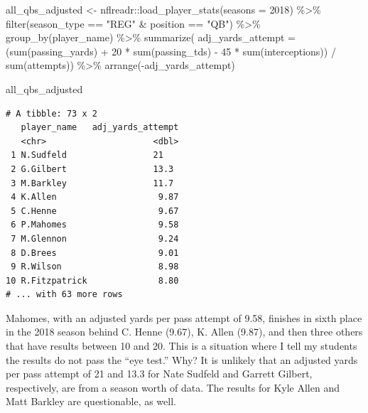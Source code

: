 \documentclass[
  letterpaper,
]{krantz}
\newenvironment{Shaded}{\begin{snugshade}}{\end{snugshade}}
\newcommand{\AttributeTok}[1]{\textcolor[rgb]{0.40,0.45,0.13}{#1}}
\newcommand{\DecValTok}[1]{\textcolor[rgb]{0.68,0.00,0.00}{#1}}
\newcommand{\FunctionTok}[1]{\textcolor[rgb]{0.28,0.35,0.67}{#1}}
\newcommand{\NormalTok}[1]{\textcolor[rgb]{0.00,0.23,0.31}{#1}}
\newcommand{\OtherTok}[1]{\textcolor[rgb]{0.00,0.23,0.31}{#1}}
\newcommand{\SpecialCharTok}[1]{\textcolor[rgb]{0.37,0.37,0.37}{#1}}
\newcommand{\StringTok}[1]{\textcolor[rgb]{0.13,0.47,0.30}{#1}}
\begin{document}
\begin{Shaded}
\begin{Highlighting}[]
\NormalTok{all\_qbs\_adjusted }\OtherTok{\textless{}{-}}\NormalTok{ nflreadr}\SpecialCharTok{::}\FunctionTok{load\_player\_stats}\NormalTok{(}\AttributeTok{seasons =} \DecValTok{2018}\NormalTok{) }\SpecialCharTok{\%\textgreater{}\%}
  \FunctionTok{filter}\NormalTok{(season\_type }\SpecialCharTok{==} \StringTok{"REG"} \SpecialCharTok{\&}\NormalTok{ position }\SpecialCharTok{==} \StringTok{"QB"}\NormalTok{) }\SpecialCharTok{\%\textgreater{}\%}
  \FunctionTok{group\_by}\NormalTok{(player\_name) }\SpecialCharTok{\%\textgreater{}\%}
  \FunctionTok{summarize}\NormalTok{(}
    \AttributeTok{adj\_yards\_attempt =}\NormalTok{ (}\FunctionTok{sum}\NormalTok{(passing\_yards) }\SpecialCharTok{+} \DecValTok{20} \SpecialCharTok{*}
                           \FunctionTok{sum}\NormalTok{(passing\_tds) }\SpecialCharTok{{-}} \DecValTok{45} \SpecialCharTok{*}
                           \FunctionTok{sum}\NormalTok{(interceptions)) }\SpecialCharTok{/} \FunctionTok{sum}\NormalTok{(attempts)) }\SpecialCharTok{\%\textgreater{}\%}
  \FunctionTok{arrange}\NormalTok{(}\SpecialCharTok{{-}}\NormalTok{adj\_yards\_attempt)}

\NormalTok{all\_qbs\_adjusted}
\end{Highlighting}
\end{Shaded}

\begin{verbatim}
# A tibble: 73 x 2
   player_name   adj_yards_attempt
   <chr>                     <dbl>
 1 N.Sudfeld                 21   
 2 G.Gilbert                 13.3 
 3 M.Barkley                 11.7 
 4 K.Allen                    9.87
 5 C.Henne                    9.67
 6 P.Mahomes                  9.58
 7 M.Glennon                  9.24
 8 D.Brees                    9.01
 9 R.Wilson                   8.98
10 R.Fitzpatrick              8.80
# ... with 63 more rows
\end{verbatim}

Mahomes, with an adjusted yards per pass attempt of 9.58, finishes in
sixth place in the 2018 season behind C. Henne (9.67), K. Allen (9.87),
and then three others that have results between 10 and 20. This is a
situation where I tell my students the results do not pass the ``eye
test.'' Why? It is unlikely that an adjusted yards per pass attempt of
21 and 13.3 for Nate Sudfeld and Garrett Gilbert, respectively, are from
a season worth of data. The results for Kyle Allen and Matt Barkley are
questionable, as well.
\end{document}
